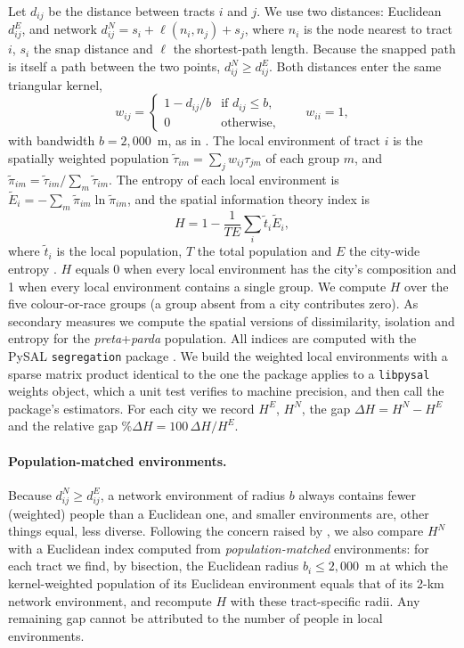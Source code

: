 Let $d_{ij}$ be the distance between tracts $i$ and $j$. We use two distances: Euclidean $d^{E}_{ij}$, and network
$d^{N}_{ij} = s_i + \ell(n_i, n_j) + s_j$, where $n_i$ is the node nearest to tract $i$, $s_i$ the snap distance and
$\ell$ the shortest-path length. Because the snapped path is itself a path between the two points,
$d^{N}_{ij} \geq d^{E}_{ij}$. Both distances enter the same triangular kernel,
\begin{equation}
  w_{ij} = \begin{cases} 1 - d_{ij}/b & \text{if } d_{ij} \le b,\\ 0 & \text{otherwise,}\end{cases}
  \qquad w_{ii} = 1,
  \label{eq:kernel}
\end{equation}
with bandwidth $b = 2{,}000$~m, as in \citet{knaap2024segregated}. The local environment of tract $i$ is the
spatially weighted population $\tilde{\tau}_{im} = \sum_j w_{ij}\tau_{jm}$ of each group $m$, and
$\tilde{\pi}_{im} = \tilde{\tau}_{im} / \sum_m \tilde{\tau}_{im}$. The entropy of each local environment is
$\tilde{E}_i = -\sum_m \tilde{\pi}_{im}\ln\tilde{\pi}_{im}$, and the spatial information theory index is
\begin{equation}
  H = 1 - \frac{1}{T E}\sum_i \tilde{t}_i \tilde{E}_i ,
  \label{eq:H}
\end{equation}
where $\tilde t_i$ is the local population, $T$ the total population and $E$ the city-wide entropy
\citep{reardon2004measures}. $H$ equals 0 when every local environment has the city's composition and 1 when every
local environment contains a single group. We compute $H$ over the five colour-or-race groups (a group absent from
a city contributes zero). As secondary measures we compute the spatial versions of dissimilarity, isolation and
entropy for the \emph{preta}+\emph{parda} population. All indices are computed with the PySAL \texttt{segregation}
package \citep{cortes2026segregation,cortes2020open}. We build the weighted local environments with a sparse
matrix product identical to the one the package applies to a \texttt{libpysal} weights object, which a unit test
verifies to machine precision, and then call the package's estimators. For each city we record
$H^{E}$, $H^{N}$, the gap $\Delta H = H^{N} - H^{E}$ and the relative gap $\%\Delta H = 100\,\Delta H / H^{E}$.

\paragraph{Population-matched environments.} Because $d^{N}_{ij} \ge d^{E}_{ij}$, a network environment of radius
$b$ always contains fewer (weighted) people than a Euclidean one, and smaller environments are, other things equal,
less diverse. Following the concern raised by \citet{saporito2026reconsidering}, we also compare $H^{N}$ with a
Euclidean index computed from \emph{population-matched} environments: for each tract we find, by bisection, the
Euclidean radius $b_i \le 2{,}000$~m at which the kernel-weighted population of its Euclidean environment equals
that of its 2-km network environment, and recompute $H$ with these tract-specific radii. Any remaining gap cannot
be attributed to the number of people in local environments.

